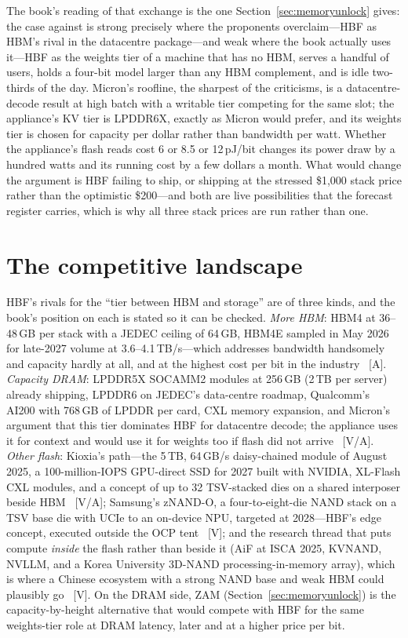 The book's reading of that exchange is the one Section~\ref{sec:memoryunlock} gives: the case against is strong precisely where the proponents overclaim---HBF as HBM's rival in the datacentre package---and weak where the book actually uses it---HBF as the weights tier of a machine that has no HBM, serves a handful of users, holds a four-bit model larger than any HBM complement, and is idle two-thirds of the day. Micron's roofline, the sharpest of the criticisms, is a datacentre-decode result at high batch with a writable tier competing for the same slot; the appliance's KV tier is LPDDR6X, exactly as Micron would prefer, and its weights tier is chosen for capacity per dollar rather than bandwidth per watt. Whether the appliance's flash reads cost 6 or 8.5 or 12\,pJ/bit changes its power draw by a hundred watts and its running cost by a few dollars a month. What would change the argument is HBF failing to ship, or shipping at the stressed \$1,000 stack price rather than the optimistic \$200---and both are live possibilities that the forecast register carries, which is why all three stack prices are run rather than one.

\section{The competitive landscape}

HBF's rivals for the ``tier between HBM and storage'' are of three kinds, and the book's position on each is stated so it can be checked. \emph{More HBM}: HBM4 at 36--48\,GB per stack with a JEDEC ceiling of 64\,GB, HBM4E sampled in May 2026 for late-2027 volume at 3.6--4.1\,TB/s---which addresses bandwidth handsomely and capacity hardly at all, and at the highest cost per bit in the industry~\cite{hbf-hbm-roadmap,hbf-samsung-fms26} [A]. \emph{Capacity DRAM}: LPDDR5X SOCAMM2 modules at 256\,GB (2\,TB per server) already shipping, LPDDR6 on JEDEC's data-centre roadmap, Qualcomm's AI200 with 768\,GB of LPDDR per card, CXL memory expansion, and Micron's argument that this tier dominates HBF for datacentre decode; the appliance uses it for context and would use it for weights too if flash did not arrive~\cite{hbf-micron-hotinfra,jedec-lpddr6-roadmap,qualcomm-ai200} [V/A]. \emph{Other flash}: Kioxia's path---the 5\,TB, 64\,GB/s daisy-chained module of August 2025, a 100-million-IOPS GPU-direct SSD for 2027 built with NVIDIA, XL-Flash CXL modules, and a concept of up to 32 TSV-stacked dies on a shared interposer beside HBM~\cite{hbf-kioxia-module,hbf-kioxia-tsv} [V/A]; Samsung's zNAND-O, a four-to-eight-die NAND stack on a TSV base die with UCIe to an on-device NPU, targeted at 2028---HBF's edge concept, executed outside the OCP tent~\cite{hbf-samsung-fms26} [V]; and the research thread that puts compute \emph{inside} the flash rather than beside it (AiF at ISCA 2025, KVNAND, NVLLM, and a Korea University 3D-NAND processing-in-memory array), which is where a Chinese ecosystem with a strong NAND base and weak HBM could plausibly go~\cite{hbf-inflash} [V]. On the DRAM side, ZAM (Section~\ref{sec:memoryunlock}) is the capacity-by-height alternative that would compete with HBF for the same weights-tier role at DRAM latency, later and at a higher price per bit.

